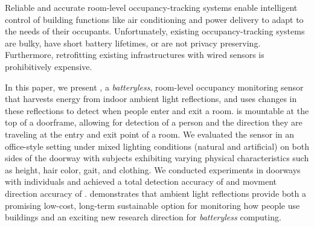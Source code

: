Reliable and accurate room-level occupancy-tracking systems enable intelligent control of building functions like air conditioning and power delivery to adapt to the needs of their occupants.
Unfortunately, existing occupancy-tracking systems are bulky, have short battery lifetimes, or are not privacy preserving.
Furthermore, retrofitting existing infrastructures with wired sensors is prohibitively expensive.

In this paper, we present \sysname, a \textit{batteryless}, room-level occupancy monitoring sensor that harvests energy from indoor ambient light reflections, and uses changes in these reflections to detect when people enter and exit a room.
\sysname is mountable at the top of a doorframe, allowing for detection of a person and the direction they are traveling at the entry and exit point of a room.
We evaluated the \sysname sensor in an office-style setting under mixed lighting conditions (natural and artificial) on both sides of the doorway with subjects exhibiting varying physical characteristics such as height, hair color, gait, and clothing.
We conducted \numExp experiments in \numDoors doorways with \numPeople individuals and achieved a total detection accuracy of \SysAccuracy and movment direction accuracy of \dirAccuracy.
\sysname demonstrates that ambient light reflections provide both a promising low-cost, long-term sustainable option for monitoring how people use buildings and an exciting new research direction for \textit{batteryless} computing.
